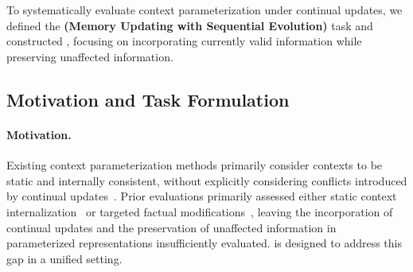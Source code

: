 \section{\benchmark{}}
\label{sec:benchmark}

To systematically evaluate context parameterization under continual updates, we defined the \textbf{\task{} (Memory Updating with Sequential Evolution)} task and constructed \textbf{\benchmark{}}, focusing on incorporating currently valid information while preserving unaffected information.


\subsection{Motivation and Task Formulation}

\paragraph{Motivation.}
Existing context parameterization methods primarily consider contexts to be static and internally consistent, without explicitly considering conflicts introduced by continual updates~\citep{charakorn2026doc,liu2026shine}. 
Prior evaluations primarily assessed either static context internalization~\citep{snell2022learning,charakorn2026doc,liu2026shine} or targeted factual modifications~\citep{meng2022locating,meng2023massediting}, leaving the incorporation of continual updates and the preservation of unaffected information in parameterized representations insufficiently evaluated.
\benchmark{} is designed to address this gap in a unified setting.

